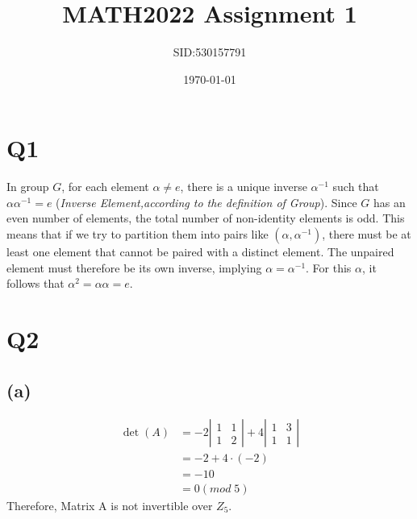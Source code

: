 \documentclass[12pt]{article}
\title{MATH2022 Assignment 1}
\author{SID:530157791}
\date{\today}
\begin{document}
\maketitle

\section{Q1}
	In group $G$, for each element $\alpha \neq e$, there is a unique inverse $\alpha^{-1}$ such that $\alpha \alpha^{-1} = e$ (\textit{Inverse Element,according to the definition of Group}). Since $G$ has an even number of elements, the total number of non-identity elements is odd. This means that if we try to partition them into pairs like $(\alpha,\alpha^{-1})$, there must be at least one element that cannot be paired with a distinct element. The unpaired element must therefore be its own inverse, implying $\alpha = \alpha^{-1}$. For this $\alpha$, it follows that $\alpha^2 = \alpha \alpha = e$.

\section{Q2}
	\subsection*{(a)}
		$$
		\begin{aligned}
		\operatorname{det}(A) & =-2\left|\begin{array}{ll}
		1 & 1 \\
		1 & 2
		\end{array}\right|+4\left|\begin{array}{ll}
		1 & 3 \\
		1 & 1
		\end{array}\right| \\
		& =-2+4 \cdot(-2) \\
		& =-10 \\
		& =0 (mod \; 5)
		\end{aligned}
		$$
		Therefore, Matrix A is not invertible over $Z_5$.
\end{document}
